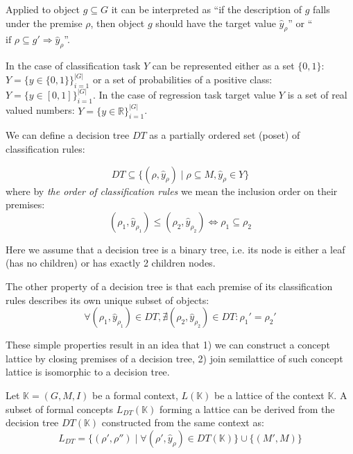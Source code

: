 \documentclass[runningheads]{llncs}
\begin{document}
Applied to object $g \subseteq G$ it can be interpreted as ``if the description of $g$ falls under the premise $\rho$, then object $g$ should have the target value $\hat{y}_\rho$'' or ``$\text{if } \rho \subseteq g' \Rightarrow \hat{y}_\rho$''.

In the case of classification task $Y$ can be represented either as a set $\{0, 1\}$: $Y = \{ y \in \{0, 1\}\}_{i=1}^{|G|}$ or a set of probabilities of a positive class: $Y = \{y \in [0,1]\}_{i=1}^{|G|}$. In the case of regression task target value $Y$ is a set of real valued numbers: $Y = \{y \in \mathbb{R}\}_{i=1}^{|G|}$.


We can define a decision tree $DT$ as a partially ordered set (poset) of classification rules:

\begin{equation}
     DT \subseteq \{ (\rho, \hat{y}_{\rho}) \mid \rho \subseteq M, \hat{y}_\rho \in Y \}
\end{equation}
where by \emph{the order of classification rules} we mean the inclusion order on their premises:
\begin{equation}
    (\rho_1, \hat{y}_{\rho_1}) \leq (\rho_2, \hat{y}_{\rho_2}) \Leftrightarrow \rho_1 \subseteq \rho_2 
\end{equation}

Here we assume that a decision tree is a binary tree, i.e. its node is either a leaf (has no children) or has exactly 2 children nodes.

The other property of a decision tree is that each premise of its classification rules describes its own unique subset of objects:
\begin{equation}
\label{eq:unique_clfrule}
    \forall (\rho_1, \hat{y}_{\rho_1}) \in DT, \nexists (\rho_2, \hat{y}_{\rho_2}) \in DT: \rho_1' = \rho_2'
\end{equation}

These simple properties result in an idea that 1) we can construct a concept lattice by closing premises of a decision tree, 2) join semilattice of such concept lattice is isomorphic to a decision tree.

\begin{proposition}
\label{prop:lattice_by_dt}
Let $\mathbb{K}=(G,M,I)$ be a formal context, $L(\mathbb{K})$ be a lattice of the context $\mathbb{K}$. A subset of formal concepts $L_{DT}(\mathbb{K})$ %
forming a lattice can be derived from the decision tree $DT(\mathbb{K})$ constructed from the same context as:
\begin{equation}
    L_{DT} = \{ (\rho', \rho'') \mid \forall (\rho', \hat{y}_\rho ) \in DT(\mathbb{K}) \} \cup \{ (M', M) \}
\end{equation}
\end{proposition}
\end{document}
